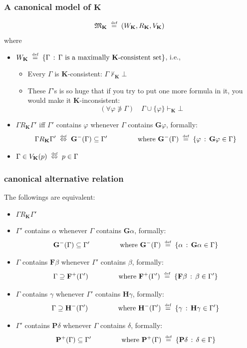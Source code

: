 \documentclass[xcolor=x11names]{beamer}
\newcommand{\FD}{\mathbf F}
\newcommand{\FB}{\mathbf G}
\newcommand{\PD}{\mathbf P}
\newcommand{\PB}{\mathbf H}
\newcommand{\defegy}[1][.1]{\hspace{#1cm}\overset{\textup{\tiny def}}{=}\hspace{#1cm}}
\newcommand{\defekv}[1][.1]{\hspace{#1cm}\overset{\textup{\tiny def}}{ \Leftrightarrow }\hspace{#1cm}}
\newcommand{\forallp}[1]{(\forall #1)}
\begin{document}
\begin{frame}
\frametitle{A canonical model of $\mathbf K$}

\[\mathfrak M_{\mathbf K} \defegy \left( W_{\mathbf K}, R_{\mathbf K}, V_{\mathbf K}\right)   \]
where
\begin{itemize}
\item $W_{\mathbf K} \defegy \{\Gamma \, :\, \textup{$ \Gamma$  is a maximally $\mathbf K$-consistent set} \}$, i.e.,
\begin{itemize}\footnotesize
\item Every $\Gamma$ is $\mathbf K$-consistent: $\Gamma \not \vdash_{\mathbf K} \bot$
\item These $\Gamma$'s is so huge that if you try to put one more formula in it, you would make it $\mathbf K$-inconsistent:
\[ \forallp {\varphi\not \ni \Gamma} \quad \Gamma \cup \{\varphi \}\vdash_{\mathbf K}\bot\]
\end{itemize}
\item $\Gamma R_{\mathbf K}\Gamma'$ iff $\Gamma'$ contains $\varphi$ whenever $\Gamma$ contains $\FB \varphi$, formally:
 \[ \Gamma R_{\mathbf K}\Gamma' \defekv \FB^-(\Gamma )\subseteq \Gamma' \qquad \qquad \textup{ where }\FB^-(\Gamma)\defegy \{\varphi \, : \, \FB \varphi \in \Gamma\}\]
\item $\Gamma \in V_{\mathbf K}(p) \defekv p\in \Gamma$
\end{itemize}


\end{frame}



\begin{frame}
\frametitle{canonical alternative relation}
The followings are equivalent:

\begin{itemize}
\item $\Gamma R_{\mathbf K}\Gamma'$
\item  $\Gamma'$ contains $\alpha$ whenever $\Gamma$ contains $\FB \alpha$, formally:
 \[ \FB^-(\Gamma )\subseteq \Gamma' \qquad \qquad \textup{ where }\FB^-(\Gamma)\defegy \{\alpha \, : \, \FB \alpha \in \Gamma\}\]
\item  $\Gamma$ contains $\FD\beta$ whenever $\Gamma'$ contains $\beta$, formally:
 \[ \Gamma \supseteq \FD^+(\Gamma') \qquad \qquad \textup{ where }\FD^+(\Gamma')\defegy \{\FD \beta \, : \, \beta \in \Gamma'\}\]
\item  $\Gamma$ contains $\gamma$ whenever $\Gamma'$ contains $\PB \gamma$, formally:
 \[ \Gamma \supseteq \PB^-(\Gamma') \qquad \qquad \textup{ where }\PB^-(\Gamma')\defegy \{\gamma \, : \, \PB \gamma \in \Gamma'\}\]
\item  $\Gamma'$ contains $\PD\delta$ whenever $\Gamma$ contains $\delta$, formally:
 \[  \PD^+(\Gamma)\subseteq \Gamma' \qquad \qquad \textup{ where }\PD^+(\Gamma)\defegy \{\PD \delta \, : \, \delta \in \Gamma\}\]
\end{itemize}


\end{frame}
\end{document}
